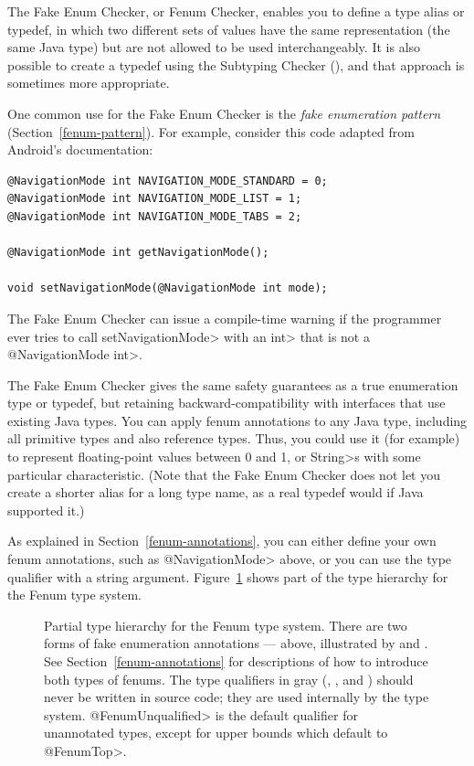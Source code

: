 \htmlhr
{}

The Fake Enum Checker, or Fenum Checker, enables you to define a type alias
or typedef, in which two different sets of values have the same
representation (the same Java type) but are not allowed to be used
interchangeably.  It is also possible to create a typedef using the
Subtyping Checker (), and that approach
is sometimes more appropriate.

One common use for the Fake Enum Checker is the
\emph{fake enumeration pattern} (Section~\ref{fenum-pattern}).  For
example, consider this code adapted from Android's
\href{https://developer.android.com/reference/android/support/annotation/IntDef}{}
documentation:

\begin{Verbatim}
@NavigationMode int NAVIGATION_MODE_STANDARD = 0;
@NavigationMode int NAVIGATION_MODE_LIST = 1;
@NavigationMode int NAVIGATION_MODE_TABS = 2;

@NavigationMode int getNavigationMode();

void setNavigationMode(@NavigationMode int mode);
\end{Verbatim}

The Fake Enum Checker can issue a compile-time warning if the programmer
ever tries to call \<setNavigationMode> with an \<int> that is not a
\<@NavigationMode int>.

The Fake Enum Checker gives the same safety guarantees as a true enumeration
type or typedef, but retaining backward-compatibility with interfaces that
use existing Java types.  You can apply fenum annotations to any Java type,
including all primitive types and also reference types.  Thus, you could
use it (for example) to represent floating-point values between 0 and 1, or
\<String>s with some particular characteristic.
(Note that the Fake Enum Checker does not let you create a shorter alias
for a long type name, as a real typedef would if Java supported it.)

As explained in Section~\ref{fenum-annotations}, you can either define your
own fenum annotations, such as \<@NavigationMode> above, or you can use the
 type qualifier with a string argument.
Figure~\ref{fig-fenum-hierarchy} shows part of the type hierarchy for the
Fenum type system.

\begin{figure}
\caption{Partial type hierarchy for the Fenum type system.
There are two forms of fake enumeration annotations --- above, illustrated
by  and .
See Section~\ref{fenum-annotations} for descriptions of how to
introduce both types of fenums. The type qualifiers in gray
(,
, and
)
should never be written in
source code; they are used internally by the type system.
\<@FenumUnqualified> is the default qualifier for unannotated types, except
for upper bounds which default to \<@FenumTop>.
}
\label{fig-fenum-hierarchy}
\end{figure}

